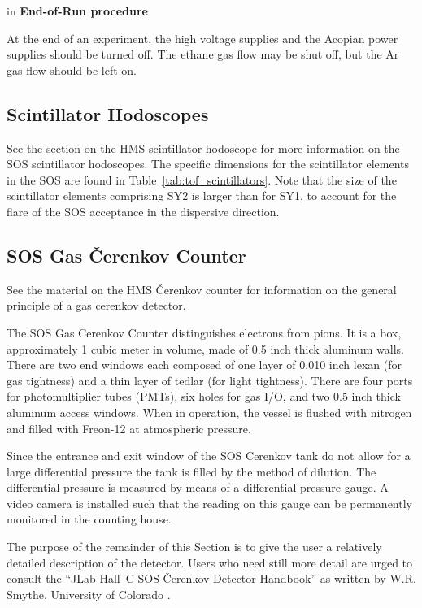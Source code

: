  in
{\bf End-of-Run procedure}

At the end of an experiment, the high voltage supplies and the Acopian
power supplies should be turned off.  The ethane gas flow may be shut
off, but the Ar gas flow should be left on.


\subsection{Scintillator Hodoscopes }

See the section on the HMS scintillator hodoscope for more information on the SOS scintillator hodoscopes.  The specific dimensions for the scintillator elements in the SOS
are found in Table~\ref{tab:tof_scintillators}.
Note that the size of the scintillator elements
comprising SY2 is larger than for SY1, to account for the flare of the
SOS acceptance in the dispersive direction.

\subsection{SOS Gas \v{C}erenkov Counter}

See the material on the HMS \v{C}erenkov counter for information on the general 
principle of a gas cerenkov detector.

The SOS Gas Cerenkov Counter distinguishes electrons from pions.  It
is a box, approximately 1 cubic meter in volume, made of 0.5 inch
thick aluminum walls.  There are two end windows each composed of one
layer of 0.010 inch lexan (for gas tightness) and a thin layer of
tedlar (for light tightness).  There are four ports for
photomultiplier tubes (PMTs), six holes for gas I/O, and two 0.5 inch
thick aluminum access windows.  When in operation, the vessel is
flushed with nitrogen and filled with Freon-12 at atmospheric
pressure.

Since the entrance and exit window of the
SOS Cerenkov tank do not allow for a large differential pressure the
tank is filled by the method of dilution.
The differential pressure is measured by means of a differential
pressure gauge.
A video camera is installed such that the reading on this gauge can be
permanently monitored in the counting house.

	The purpose of the remainder of this Section is to give the user
a relatively detailed description of the detector.  Users who need still more
detail are urged to consult the ``JLab Hall~C SOS \v{C}erenkov
Detector Handbook'' as written by W.R. Smythe, University of Colorado
\cite{bi:Smythe}.


